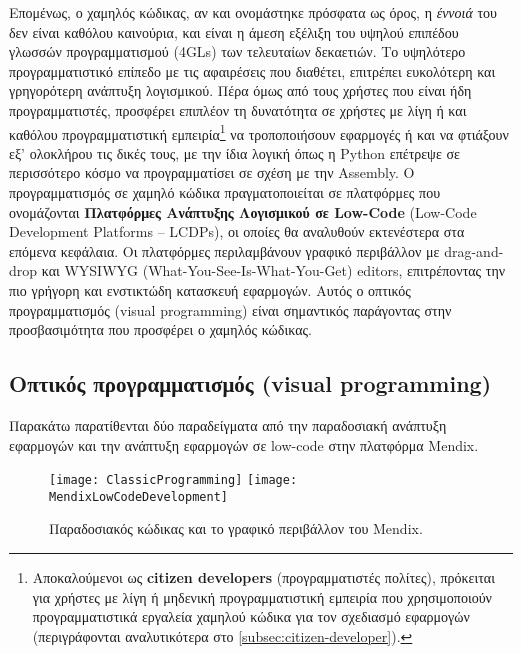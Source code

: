         Επομένως, ο χαμηλός κώδικας, αν και ονομάστηκε πρόσφατα ως όρος, η \textit{έννοιά} του δεν είναι καθόλου καινούρια, και είναι η άμεση εξέλιξη του υψηλού επιπέδου γλωσσών προγραμματισμού (4GLs) των τελευταίων δεκαετιών. Το υψηλότερο προγραμματιστικό επίπεδο με τις αφαιρέσεις που διαθέτει, επιτρέπει ευκολότερη και γρηγορότερη ανάπτυξη λογισμικού. Πέρα όμως από τους χρήστες που είναι ήδη προγραμματιστές, προσφέρει επιπλέον τη δυνατότητα σε χρήστες με λίγη ή και καθόλου προγραμματιστική εμπειρία\footnote{Αποκαλούμενοι ως \textbf{citizen developers} (προγραμματιστές πολίτες), πρόκειται για χρήστες με λίγη ή μηδενική προγραμματιστική εμπειρία που χρησιμοποιούν προγραμματιστικά εργαλεία χαμηλού κώδικα για τον σχεδιασμό εφαρμογών (περιγράφονται αναλυτικότερα στο \ref{subsec:citizen-developer}).} να τροποποιήσουν εφαρμογές ή και να φτιάξουν εξ' ολοκλήρου τις δικές τους, με την ίδια λογική όπως η Python επέτρεψε σε περισσότερο κόσμο να προγραμματίσει σε σχέση με την Assembly. Ο προγραμματισμός σε χαμηλό κώδικα πραγματοποιείται σε πλατφόρμες που ονομάζονται \textbf{Πλατφόρμες Ανάπτυξης Λογισμικού σε Low-Code} (Low-Code Development Platforms -- LCDPs), οι οποίες θα αναλυθούν εκτενέστερα στα επόμενα κεφάλαια. Οι πλατφόρμες περιλαμβάνουν γραφικό περιβάλλον με drag-and-drop και WYSIWYG (What-You-See-Is-What-You-Get) editors, επιτρέποντας την πιο γρήγορη και ενστικτώδη κατασκευή εφαρμογών. Αυτός ο οπτικός προγραμματισμός (visual programming) είναι σημαντικός παράγοντας στην προσβασιμότητα που προσφέρει ο χαμηλός κώδικας. \cite{LowCodeMendix} \cite{LowCodeSimon} \cite{LowCodeDemocratization}

            \subsection{Οπτικός προγραμματισμός (visual programming)}
                Παρακάτω παρατίθενται δύο παραδείγματα από την παραδοσιακή ανάπτυξη εφαρμογών και την ανάπτυξη εφαρμογών σε low-code στην πλατφόρμα Mendix.

                \begin{figure}[H] \noindent \centering
                        \texttt{[image: ClassicProgramming]}
                        \texttt{[image: MendixLowCodeDevelopment]}
                        \caption{Παραδοσιακός κώδικας και το γραφικό περιβάλλον του Mendix.}
                        \label{fig:codevsmendix}
                \end{figure}

